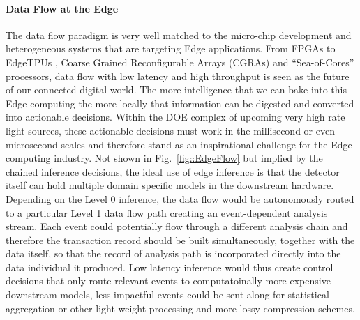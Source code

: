 \documentclass{article}
\begin{document}




\paragraph{Data Flow at the Edge}
The data flow paradigm is very well matched to the micro-chip development and heterogeneous systems that are targeting Edge applications.
From FPGAs to EdgeTPUs \cite{edgetpu,edgetpu_benchmarks}, Coarse Grained Reconfigurable Arrays (CGRAs) \cite{CGRAreview,waveCGRA} and ``Sea-of-Cores'' \cite{seaofcores} processors, data flow with low latency and high throughput is seen as the future of our connected digital world.
The more intelligence that we can bake into this Edge computing the more locally that information can be digested and converted into actionable decisions.
Within the DOE complex of upcoming very high rate light sources, these actionable decisions must work in the millisecond or even microsecond scales and therefore stand as an inspirational challenge for the Edge computing industry.
Not shown in Fig.~\ref{fig::EdgeFlow} but implied by the chained inference decisions, the ideal use of edge inference is that the detector itself can hold multiple domain specific models in the downstream hardware.
Depending on the Level 0 inference, the data flow would be autonomously routed to a particular Level 1 data flow path creating an event-dependent analysis stream.%
Each event could potentially flow through a different analysis chain and therefore the transaction record should be built simultaneously, together with the data itself, so that the record of analysis path is incorporated directly into the data individual it produced. 
Low latency inference would thus create control decisions that only route relevant events to computatoinally more expensive downstream models, less impactful events could be sent along for statistical aggregation or other light weight processing and more lossy compression schemes.
\end{document}
